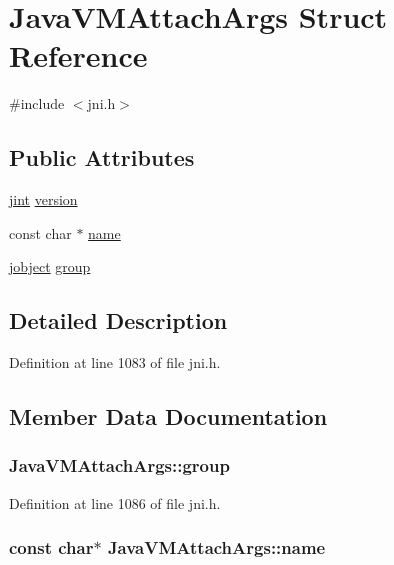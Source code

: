 \hypertarget{struct_java_v_m_attach_args}{\section{Java\-V\-M\-Attach\-Args Struct Reference}
\label{struct_java_v_m_attach_args}
}


{\ttfamily \#include $<$jni.\-h$>$}

\subsection*{Public Attributes}
\begin{DoxyCompactItemize}
\item 
\hyperlink{jni_8h_ad6e59d976b9b5bae7a19d746bd2879c1}{jint} \hyperlink{struct_java_v_m_attach_args_a8759e4d59cc61c1d396438e3cc3f0f07}{version}
\item 
const char $\ast$ \hyperlink{struct_java_v_m_attach_args_ade31015a61a360bd993f0c7c3b7bc60d}{name}
\item 
\hyperlink{jni_8h_a24647d2a2f02c39f6338c2c6ce4c1004}{jobject} \hyperlink{struct_java_v_m_attach_args_a1eccd32a55efd31c7d3e55d1cd34cf9a}{group}
\end{DoxyCompactItemize}


\subsection{Detailed Description}


Definition at line 1083 of file jni.\-h.



\subsection{Member Data Documentation}
\hypertarget{struct_java_v_m_attach_args_a1eccd32a55efd31c7d3e55d1cd34cf9a}{
\subsubsection[{group}]{ Java\-V\-M\-Attach\-Args\-::group}}\label{struct_java_v_m_attach_args_a1eccd32a55efd31c7d3e55d1cd34cf9a}


Definition at line 1086 of file jni.\-h.

\hypertarget{struct_java_v_m_attach_args_ade31015a61a360bd993f0c7c3b7bc60d}{
\subsubsection[{name}]{\setlength{\rightskip}{0pt plus 5cm}const char$\ast$ Java\-V\-M\-Attach\-Args\-::name}}\label{struct_java_v_m_attach_args_ade31015a61a360bd993f0c7c3b7bc60d}


